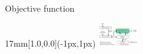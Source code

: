   






















\begin{frame}{Objective function}
  \begin{textblock*}{17mm}[1.0,0.0](\paperwidth-1px,1px)
    \includegraphics[width=17mm]{blocos_s3.png}
  \end{textblock*}
\end{frame}
\addtocounter{framenumber}{-1}


